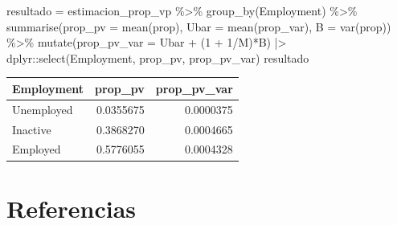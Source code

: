 \documentclass[
  12pt,
]{book}
\newenvironment{Shaded}{\begin{snugshade}}{\end{snugshade}}
\newcommand{\AttributeTok}[1]{\textcolor[rgb]{0.77,0.63,0.00}{#1}}
\newcommand{\DecValTok}[1]{\textcolor[rgb]{0.00,0.00,0.81}{#1}}
\newcommand{\FunctionTok}[1]{\textcolor[rgb]{0.00,0.00,0.00}{#1}}
\newcommand{\NormalTok}[1]{#1}
\newcommand{\OtherTok}[1]{\textcolor[rgb]{0.56,0.35,0.01}{#1}}
\newcommand{\SpecialCharTok}[1]{\textcolor[rgb]{0.00,0.00,0.00}{#1}}
\begin{document}
\begin{Shaded}
\begin{Highlighting}[]
\NormalTok{resultado }\OtherTok{=}\NormalTok{ estimacion\_prop\_vp }\SpecialCharTok{\%\textgreater{}\%} 
  \FunctionTok{group\_by}\NormalTok{(Employment) }\SpecialCharTok{\%\textgreater{}\%} 
  \FunctionTok{summarise}\NormalTok{(}\AttributeTok{prop\_pv =} \FunctionTok{mean}\NormalTok{(prop),}
            \AttributeTok{Ubar =} \FunctionTok{mean}\NormalTok{(prop\_var),}
            \AttributeTok{B =} \FunctionTok{var}\NormalTok{(prop)) }\SpecialCharTok{\%\textgreater{}\%} 
  \FunctionTok{mutate}\NormalTok{(}\AttributeTok{prop\_pv\_var =}\NormalTok{ Ubar }\SpecialCharTok{+}\NormalTok{ (}\DecValTok{1} \SpecialCharTok{+} \DecValTok{1}\SpecialCharTok{/}\NormalTok{M)}\SpecialCharTok{*}\NormalTok{B) }\SpecialCharTok{|\textgreater{}} 
\NormalTok{  dplyr}\SpecialCharTok{::}\FunctionTok{select}\NormalTok{(Employment, prop\_pv, prop\_pv\_var)}
\NormalTok{resultado}
\end{Highlighting}
\end{Shaded}

\begin{tabular}{l|r|r}
\hline
Employment & prop\_pv & prop\_pv\_var\\
\hline
Unemployed & 0.0355675 & 0.0000375\\
\hline
Inactive & 0.3868270 & 0.0004665\\
\hline
Employed & 0.5776055 & 0.0004328\\
\hline
\end{tabular}

\hypertarget{referencias}{%
\chapter{Referencias}\label{referencias}}
\end{document}
